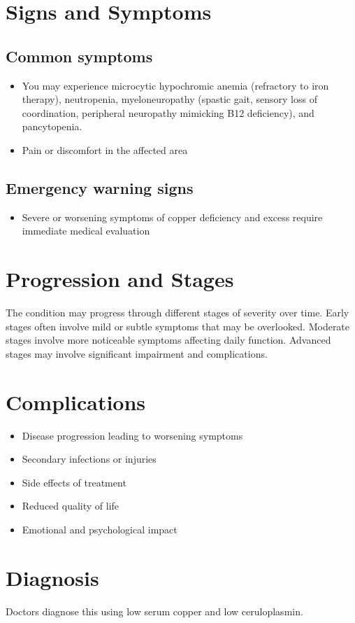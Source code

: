 \section{Signs and Symptoms}
\subsection{Common symptoms}
\begin{itemize}[noitemsep]
  \item You may experience microcytic hypochromic anemia (refractory to iron therapy), neutropenia, myeloneuropathy (spastic gait, sensory loss of coordination, peripheral neuropathy mimicking B12 deficiency), and pancytopenia.
  \item Pain or discomfort in the affected area
  \end{itemize}
\subsection{Emergency warning signs}
\begin{itemize}[noitemsep]
  \item Severe or worsening symptoms of copper deficiency and excess require immediate medical evaluation
\end{itemize}
\section{Progression and Stages}
The condition may progress through different stages of severity over time. Early stages often involve mild or subtle symptoms that may be overlooked. Moderate stages involve more noticeable symptoms affecting daily function. Advanced stages may involve significant impairment and complications.
\section{Complications}
\begin{itemize}[noitemsep]
  \item Disease progression leading to worsening symptoms
  \item Secondary infections or injuries
  \item Side effects of treatment
  \item Reduced quality of life
  \item Emotional and psychological impact
\end{itemize}
\section{Diagnosis}
Doctors diagnose this using low serum copper and low ceruloplasmin.

